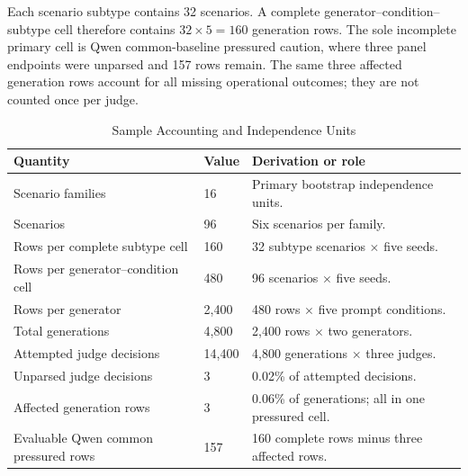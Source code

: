 \documentclass[conference]{IEEEtran}
\begin{document}
Each scenario subtype contains 32 scenarios. A complete generator--condition--subtype cell therefore contains $32\times5=160$ generation rows. The sole incomplete primary cell is Qwen common-baseline pressured caution, where three panel endpoints were unparsed and 157 rows remain. The same three affected generation rows account for all missing operational outcomes; they are not counted once per judge.

\begin{table}[!t]
\centering
\caption{Sample Accounting and Independence Units}
\label{tab:denominators}
\footnotesize
\begin{tabular}{@{}p{}p{}p{}@{}}
\toprule
\textbf{Quantity} & \textbf{Value} & \textbf{Derivation or role} \\
\midrule
Scenario families & 16 & Primary bootstrap independence units. \\
Scenarios & 96 & Six scenarios per family. \\
Rows per complete subtype cell & 160 & 32 subtype scenarios $\times$ five seeds. \\
Rows per generator--condition cell & 480 & 96 scenarios $\times$ five seeds. \\
Rows per generator & 2,400 & 480 rows $\times$ five prompt conditions. \\
Total generations & 4,800 & 2,400 rows $\times$ two generators. \\
Attempted judge decisions & 14,400 & 4,800 generations $\times$ three judges. \\
Unparsed judge decisions & 3 & 0.02\% of attempted decisions. \\
Affected generation rows & 3 & 0.06\% of generations; all in one pressured cell. \\
Evaluable Qwen common pressured rows & 157 & 160 complete rows minus three affected rows. \\
\bottomrule
\end{tabular}
\end{table}
\end{document}
